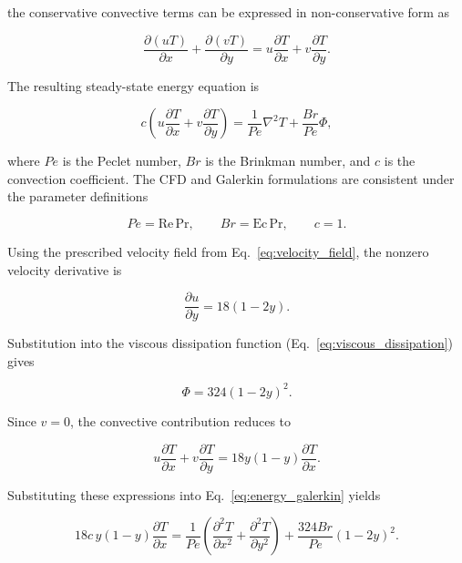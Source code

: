 the conservative convective terms can be expressed in non-conservative
form as

\begin{equation}
    \frac{\partial (uT)}{\partial x}
    +\frac{\partial (vT)}{\partial y}
    =
    u\frac{\partial T}{\partial x}
    +v\frac{\partial T}{\partial y}.
\end{equation}

The resulting steady-state energy equation is

\begin{equation}
    c\left(
    u\frac{\partial T}{\partial x}
    +v\frac{\partial T}{\partial y}
    \right)
    =
    \frac{1}{Pe}\nabla^2 T
    +\frac{Br}{Pe}\Phi,
    \label{eq:energy_galerkin}
\end{equation}

where $Pe$ is the Peclet number, $Br$ is the Brinkman number,
and $c$ is the convection coefficient. The CFD and Galerkin
formulations are consistent under the parameter definitions

\begin{equation}
    Pe=\mathrm{Re}\,\mathrm{Pr},
    \qquad
    Br=\mathrm{Ec}\,\mathrm{Pr},
    \qquad
    c=1.
    \label{eq:dimensionless_parameter_relation}
\end{equation}

Using the prescribed velocity field from
Eq.~\eqref{eq:velocity_field}, the nonzero velocity derivative is

\begin{equation}
    \frac{\partial u}{\partial y}=18(1-2y).
\end{equation}

Substitution into the viscous dissipation function
(Eq.~\eqref{eq:viscous_dissipation}) gives

\begin{equation}
    \boxed{
        \Phi=324(1-2y)^2.
    }
    \label{eq:simplified_dissipation}
\end{equation}

Since $v=0$, the convective contribution reduces to

\begin{equation}
    u\frac{\partial T}{\partial x}
    +v\frac{\partial T}{\partial y}
    =
    18y(1-y)\frac{\partial T}{\partial x}.
\end{equation}

Substituting these expressions into
Eq.~\eqref{eq:energy_galerkin} yields

\begin{equation}
    18c\,y(1-y)\frac{\partial T}{\partial x}
    =
    \frac{1}{Pe}
    \left(
        \frac{\partial^2 T}{\partial x^2}
        +\frac{\partial^2 T}{\partial y^2}
    \right)
    +\frac{324Br}{Pe}(1-2y)^2.
    \label{eq:energy_substituted}
\end{equation}

